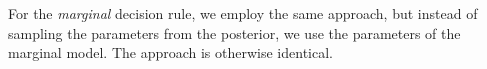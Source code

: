 For the \emph{marginal} decision rule, we employ the same approach, but instead of sampling the parameters from the posterior, we use the parameters of the marginal model. The approach is otherwise identical.

%


%



